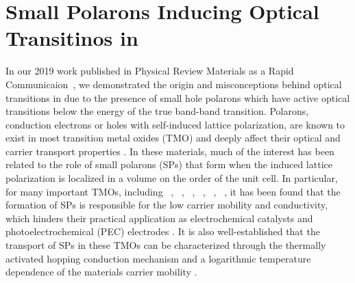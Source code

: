 \def\co{Co$_\text{3}$O$_\text{4}$}
\def\vo{V$_\text{O}$}
\def\vco{V$_\text{Co(O)}$}
\def\vct{V$_\text{Co(T)}$}

\section{Small Polarons Inducing Optical Transitinos in }

In our 2019 work published in Physical Review Materials as a Rapid Communicaion~\cite{smart2019optical}, we demonstrated the origin and misconceptions behind optical transitions in  due to the presence of small hole polarons which have active optical transitions below the energy of the true band-band transition.
Polarons, conduction electrons or holes with self-induced lattice polarization, are known to exist in most transition metal oxides (TMO) and deeply affect their optical and carrier transport properties \cite{reticcioli2019small}. In these materials, much of the interest has been related to the role of small polarons (SPs) that form when the induced lattice polarization is localized in a volume on the order of the unit cell. In particular, for many important TMOs, including ~\cite{sivula2011solar,ling2011sn,smart2017effect}, ~\cite{gong2014nanoscale,hu2014efficient}, ~\cite{wang2018phosphorus,aijaz2016}, ~\cite{jin2015partially}, ~\cite{wu2018combining,zhang2018unconventional,seo2018role,kim2015simultaneous}, ~\cite{cardiel2017electrochemical,smart2018mechanistic}, it has been found that the formation of SPs is responsible for the low carrier mobility and conductivity, which hinders their practical application as electrochemical catalysts and photoelectrochemical (PEC) electrodes \cite{lee2019progress,tachibana2012artificial,roger2017earth,yan2016review, liao2013new}. It is also well-established that the transport of SPs in these TMOs can be characterized through the thermally activated hopping conduction mechanism and a logarithmic temperature dependence of the materials carrier mobility \cite{mott1968conduction}.

